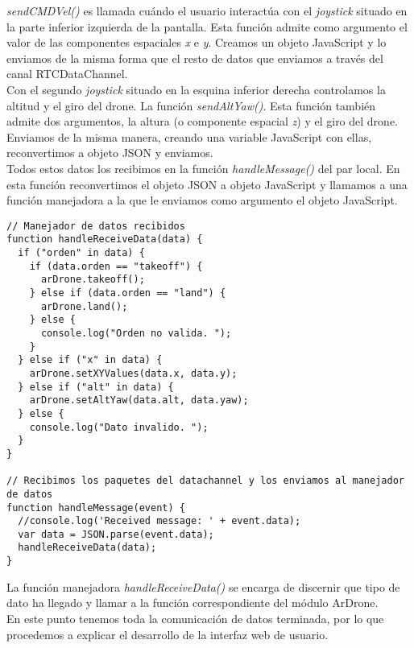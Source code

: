 \emph{sendCMDVel()} es llamada cuándo el usuario interactúa con el \emph{joystick} situado en la parte inferior izquierda de la pantalla. Esta función admite como argumento el valor de las componentes espaciales \emph{x} e \emph{y}. Creamos un objeto JavaScript y lo enviamos de la misma forma que el resto de datos que enviamos a través del canal RTCDataChannel.\\

Con el segundo \emph{joystick} situado en la esquina inferior derecha controlamos la altitud y el giro del drone. La función \emph{sendAltYaw()}. Esta función también admite dos argumentos, la altura (o componente espacial \emph{z}) y el giro del drone. Enviamos de la misma manera, creando una variable JavaScript con ellas, reconvertimos a objeto JSON y enviamos.\\

Todos estos datos los recibimos en la función \emph{handleMessage()} del par local. En esta función reconvertimos el objeto JSON a objeto JavaScript y llamamos a una función manejadora a la que le enviamos como argumento el objeto JavaScript.\\

\begin{lstlisting}[caption=Manejo de las órdenes recibidas en el par local.]
// Manejador de datos recibidos 
function handleReceiveData(data) {
  if ("orden" in data) {
    if (data.orden == "takeoff") {
      arDrone.takeoff();
    } else if (data.orden == "land") {
      arDrone.land();
    } else {
      console.log("Orden no valida. ");
    }
  } else if ("x" in data) {
    arDrone.setXYValues(data.x, data.y);
  } else if ("alt" in data) {
    arDrone.setAltYaw(data.alt, data.yaw);
  } else {
    console.log("Dato invalido. ");
  }		
}

// Recibimos los paquetes del datachannel y los enviamos al manejador de datos
function handleMessage(event) {
  //console.log('Received message: ' + event.data);
  var data = JSON.parse(event.data);
  handleReceiveData(data);
}
\end{lstlisting}


La función manejadora \emph{handleReceiveData()} se encarga de discernir que tipo de dato ha llegado y llamar a la función correspondiente del módulo ArDrone.\\

En este punto tenemos toda la comunicación de datos terminada, por lo que procedemos a explicar el desarrollo de la interfaz web de usuario.\\

